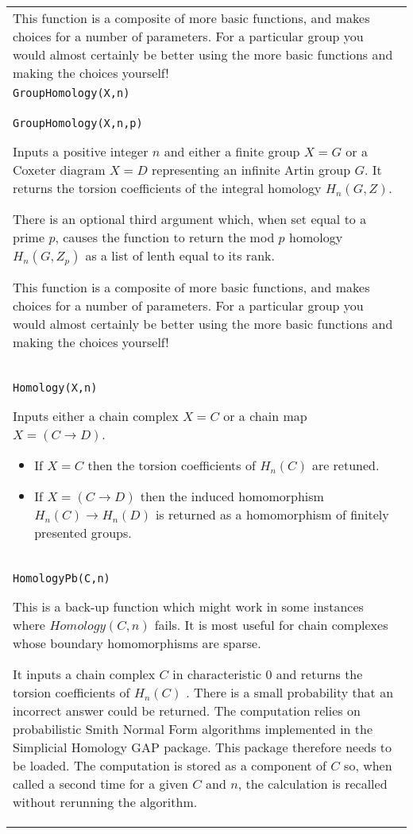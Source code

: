 \documentclass[a4paper,11pt]{report}
\begin{document}
{\begin{center}
\begin{tabular}{|l|}
 This function is a composite of more basic functions, and makes choices for a
number of parameters. For a particular group you would almost certainly be
better using the more basic functions and making the choices yourself! \\
 \index{GroupHomology} \texttt{GroupHomology(X,n)} \\
 \texttt{GroupHomology(X,n,p)} 

 Inputs a positive integer $n$ and either a finite group $X=G$ or a Coxeter diagram $X=D$ representing an infinite Artin group $G$. It returns the torsion coefficients of the integral homology $H_n(G,Z)$. 

 There is an optional third argument which, when set equal to a prime $p$, causes the function to return the mod $p$ homology $H_n(G,Z_p)$ as a list of lenth equal to its rank. 

 This function is a composite of more basic functions, and makes choices for a
number of parameters. For a particular group you would almost certainly be
better using the more basic functions and making the choices yourself! \\
 \index{Homology} \texttt{Homology(X,n)} 

 Inputs either a chain complex $X=C$ or a chain map $X=(C \longrightarrow D)$. 
\begin{itemize}
\item If $X=C$ then the torsion coefficients of $H_n(C)$ are retuned.
\item  If $X=(C \longrightarrow D)$ then the induced homomorphism $H_n(C) \longrightarrow H_n(D)$ is returned as a homomorphism of finitely presented groups. 
\end{itemize}
 \\
 \index{HomologyPb} \texttt{HomologyPb(C,n)} 

 This is a back-up function which might work in some instances where $Homology(C,n)$ fails. It is most useful for chain complexes whose boundary homomorphisms are
sparse. 

 It inputs a chain complex $C$ in characteristic $0$ and returns the torsion coefficients of $H_n(C)$ . There is a small probability that an incorrect answer could be returned. The
computation relies on probabilistic Smith Normal Form algorithms implemented
in the Simplicial Homology GAP package. This package therefore needs to be
loaded. The computation is stored as a component of $C$ so, when called a second time for a given $C$ and $n$, the calculation is recalled without rerunning the algorithm. 


\end{tabular}
\end{center}}
\end{document}
